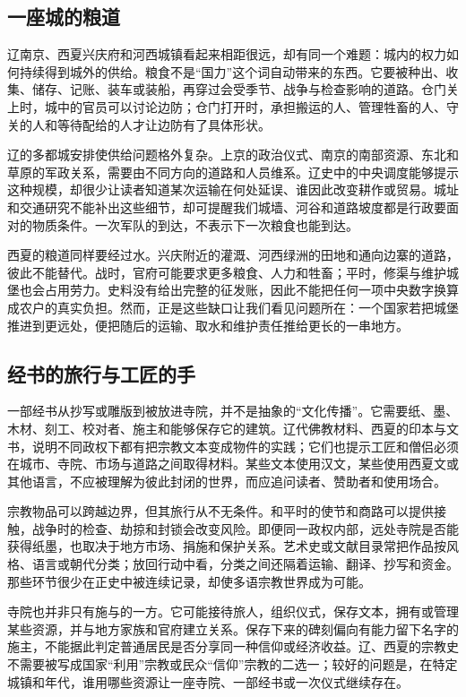 \subsection{一座城的粮道}

辽南京、西夏兴庆府和河西城镇看起来相距很远，却有同一个难题：城内的权力如何持续得到城外的供给。粮食不是“国力”这个词自动带来的东西。它要被种出、收集、储存、记账、装车或装船，再穿过会受季节、战争与检查影响的道路。仓门关上时，城中的官员可以讨论边防；仓门打开时，承担搬运的人、管理牲畜的人、守关的人和等待配给的人才让边防有了具体形状。

辽的多都城安排使供给问题格外复杂。上京的政治仪式、南京的南部资源、东北和草原的军政关系，需要由不同方向的道路和人员维系。辽史中的中央调度能够提示这种规模，却很少让读者知道某次运输在何处延误、谁因此改变耕作或贸易。城址和交通研究不能补出这些细节，却可提醒我们城墙、河谷和道路坡度都是行政要面对的物质条件。一次军队的到达，不表示下一次粮食也能到达。

西夏的粮道同样要经过水。兴庆附近的灌溉、河西绿洲的田地和通向边寨的道路，彼此不能替代。战时，官府可能要求更多粮食、人力和牲畜；平时，修渠与维护城堡也会占用劳力。史料没有给出完整的征发账，因此不能把任何一项中央数字换算成农户的真实负担。然而，正是这些缺口让我们看见问题所在：一个国家若把城堡推进到更远处，便把随后的运输、取水和维护责任推给更长的一串地方。

\subsection{经书的旅行与工匠的手}

一部经书从抄写或雕版到被放进寺院，并不是抽象的“文化传播”。它需要纸、墨、木材、刻工、校对者、施主和能够保存它的建筑。辽代佛教材料、西夏的印本与文书，说明不同政权下都有把宗教文本变成物件的实践；它们也提示工匠和僧侣必须在城市、寺院、市场与道路之间取得材料。某些文本使用汉文，某些使用西夏文或其他语言，不应被理解为彼此封闭的世界，而应追问读者、赞助者和使用场合。

宗教物品可以跨越边界，但其旅行从不无条件。和平时的使节和商路可以提供接触，战争时的检查、劫掠和封锁会改变风险。即便同一政权内部，远处寺院是否能获得纸墨，也取决于地方市场、捐施和保护关系。艺术史或文献目录常把作品按风格、语言或朝代分类；放回行动中看，分类之间还隔着运输、翻译、抄写和资金。那些环节很少在正史中被连续记录，却使多语宗教世界成为可能。

寺院也并非只有施与的一方。它可能接待旅人，组织仪式，保存文本，拥有或管理某些资源，并与地方家族和官府建立关系。保存下来的碑刻偏向有能力留下名字的施主，不能据此判定普通居民是否分享同一种信仰或经济收益。辽、西夏的宗教史不需要被写成国家“利用”宗教或民众“信仰”宗教的二选一；较好的问题是，在特定城镇和年代，谁用哪些资源让一座寺院、一部经书或一次仪式继续存在。

